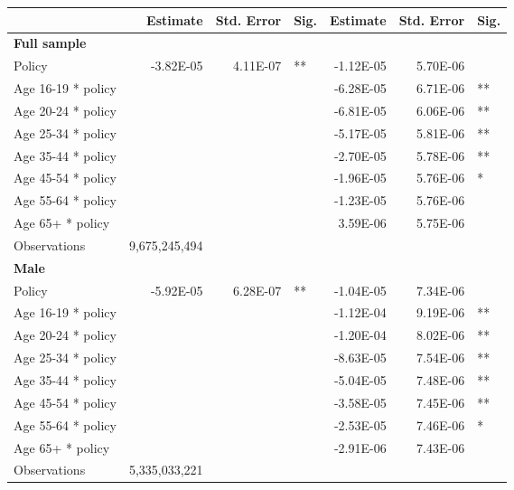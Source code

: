 
\begin{table}%
\centering 
\begin{tabular}{l r r l r r l} 

\hline 
 
 & Estimate & Std. Error & Sig. & Estimate & Std. Error & Sig. \\ 

\hline 
 
\textbf{Full sample} \\ 

Policy             &  -3.82E-05        &  4.11E-07       &   **       &  -1.12E-05        &  5.70E-06       &            \\ 
Age 16-19 * policy           & & &  &  -6.28E-05        &  6.71E-06       &   **       \\ 
Age 20-24 * policy           & & &  &  -6.81E-05        &  6.06E-06       &   **       \\ 
Age 25-34 * policy           & & &  &  -5.17E-05        &  5.81E-06       &   **       \\ 
Age 35-44 * policy           & & &  &  -2.70E-05        &  5.78E-06       &   **       \\ 
Age 45-54 * policy           & & &  &  -1.96E-05        &  5.76E-06       &    *       \\ 
Age 55-64 * policy           & & &  &  -1.23E-05        &  5.76E-06       &            \\ 
Age 65+ * policy           & & &  &  3.59E-06        &  5.75E-06       &            \\ 
Observations & 9,675,245,494 \\ 


\hline 

\textbf{Male} \\ 

Policy             &  -5.92E-05        &  6.28E-07       &   **       &  -1.04E-05        &  7.34E-06       &            \\ 
Age 16-19 * policy           & & &  &  -1.12E-04        &  9.19E-06       &   **       \\ 
Age 20-24 * policy           & & &  &  -1.20E-04        &  8.02E-06       &   **       \\ 
Age 25-34 * policy           & & &  &  -8.63E-05        &  7.54E-06       &   **       \\ 
Age 35-44 * policy           & & &  &  -5.04E-05        &  7.48E-06       &   **       \\ 
Age 45-54 * policy           & & &  &  -3.58E-05        &  7.45E-06       &   **       \\ 
Age 55-64 * policy           & & &  &  -2.53E-05        &  7.46E-06       &    *       \\ 
Age 65+ * policy           & & &  &  -2.91E-06        &  7.43E-06       &            \\ 
Observations & 5,335,033,221 \\ 



\end{tabular}
\end{table}
